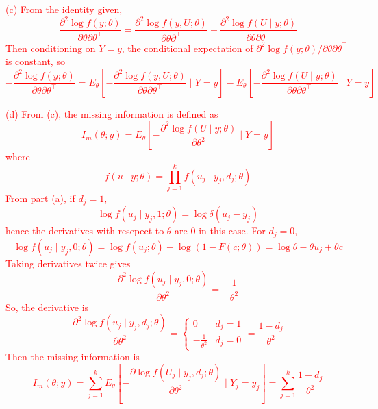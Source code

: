 \documentclass[12pt]{article}
\newcommand{\1}{\mathds 1}
\begin{document}
\begin{enumerate}
\textcolor{red}{
(c) From the identity given, 
\begin{equation*}
	\frac{\partial^2 \log f(y ; \theta)}{\partial \theta \partial \theta^\top} = \frac{\partial^2 \log f(y, U ; \theta)}{\partial \theta\partial^\top} - \frac{\partial^2 \log f(U \mid y ; \theta)}{\partial\theta\partial\theta^\top}
\end{equation*}
Then conditioning on $Y =y$, the conditional expectation of $\partial^2\log f(y ; \theta) / \partial\theta\partial\theta^\top$ is constant, so 
\begin{equation*}
	-\frac{\partial^2 \log f(y ; \theta)}{\partial \theta \partial \theta^\top} = E_\theta \left[- \frac{\partial^2 \log f(y, U ; \theta)}{\partial \theta \partial \theta^\top} \mid Y = y \right] - E_\theta\left[-\frac{\partial^2 \log f(U \mid y; \theta)}{\partial \theta \partial \theta^\top} \mid Y = y\right]
\end{equation*}
}

\textcolor{red}{
(d) From (c), the missing information is defined as 
\begin{equation*}
	I_m(\theta ; y) = E_\theta \left[-\frac{\partial^2 \log f(U \mid y ; \theta)}{\partial \theta^2}\mid Y = y\right]
\end{equation*}
where 
\begin{equation*}
	f(u \mid y ; \theta) = \prod_{j=1}^k f(u_j \mid y_j, d_j ; \theta)
\end{equation*}
From part (a), if $d_j = 1$, 
\begin{equation*}
	\log f(u_j \mid y_j, 1 ; \theta) = \log \delta(u_j - y_j)
\end{equation*}
hence the derivatives with resepect to $\theta$ are $0$ in this case. For $d_j = 0$, 
\begin{equation*}
	\log f(u_j \mid y_j , 0 ; \theta) = \log f(u_j ; \theta) - \log(1 - F(c ; \theta)) = \log \theta - \theta u_j + \theta c
\end{equation*}
Taking derivatives twice gives 
\begin{equation*}
	\frac{\partial^2 \log f(u _j\mid y_j, 0 ; \theta)}{\partial\theta^2} = -\frac{1}{\theta^2}
\end{equation*}
So, the derivative is 
\begin{equation*}
	\frac{\partial^2 \log f(u_j \mid y_j, d_j; \theta)}{\partial\theta^2} = \begin{cases}
		0 & d _j = 1\\
		-\frac{1}{\theta^2} & d_j = 0
	\end{cases} = \frac{1 - d_j}{\theta^2}
\end{equation*}
Then the missing information is 
\begin{equation*}
	I_m(\theta ; y) = \sum_{j=1}^k E_\theta \left[-\frac{\partial \log f(U_j \mid y_j, d_j; \theta)}{\partial \theta^2}\mid Y_j = y_j\right] = \sum_{j=1}^k \frac{1-d_j}{\theta^2}
\end{equation*}
}
\end{enumerate}
\end{document}

